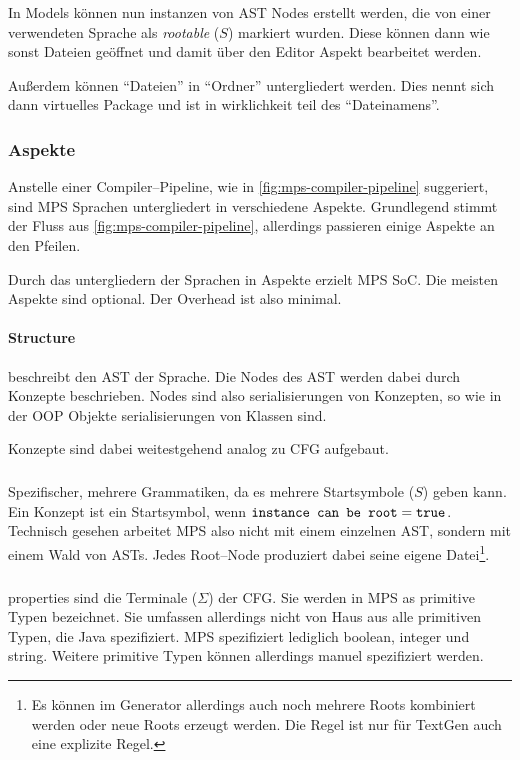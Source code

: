 In Models können nun instanzen von \ac{AST} Nodes erstellt werden, die von einer verwendeten Sprache als \textit {rootable} ($S$) markiert wurden.
Diese können dann wie sonst Dateien geöffnet und damit über den Editor Aspekt bearbeitet werden.

Außerdem können \enquote{Dateien} in \enquote{Ordner} untergliedert werden.
Dies nennt sich dann virtuelles Package und ist in wirklichkeit teil des \enquote{Dateinamens}.

\subsubsection{Aspekte}\label{subsubsec:aspekte}
Anstelle einer Compiler--Pipeline, wie in \autoref{fig:mps-compiler-pipeline} suggeriert, sind \ac{MPS} Sprachen untergliedert in verschiedene Aspekte.
Grundlegend stimmt der Fluss aus \autoref{fig:mps-compiler-pipeline}, allerdings passieren einige Aspekte an den Pfeilen.

Durch das untergliedern der Sprachen in Aspekte erzielt \ac{MPS} \ac{SoC}.
Die meisten Aspekte sind optional.
Der Overhead ist also minimal.

\paragraph{Structure} beschreibt den \ac{AST} der Sprache.
Die Nodes des \ac{AST} werden dabei durch Konzepte beschrieben.
Nodes sind also serialisierungen von Konzepten, so wie in der \ac{OOP} Objekte serialisierungen von Klassen sind.


Konzepte sind dabei weitestgehend analog zu \ac{CFG} aufgebaut.

\subparagraph*{}
Spezifischer, mehrere Grammatiken, da es mehrere Startsymbole ($S$) geben kann.
Ein Konzept ist ein Startsymbol, wenn $\text{\ttfamily instance can be root}=\text{\ttfamily true}$.
Technisch gesehen arbeitet \ac{MPS} also nicht mit einem einzelnen \ac{AST}, sondern mit einem Wald von \acp{AST}.
Jedes Root--Node produziert dabei seine eigene Datei\footnote{Es können im Generator allerdings auch noch mehrere Roots kombiniert werden oder neue Roots erzeugt werden. Die Regel ist nur für TextGen auch eine explizite Regel.}.

\subparagraph*{}
{\ttfamily properties} sind die Terminale ($\Sigma$) der \ac{CFG}.
Sie werden in \ac{MPS} as primitive Typen bezeichnet.
Sie umfassen allerdings nicht von Haus aus alle primitiven Typen, die Java spezifiziert.
\ac{MPS} spezifiziert lediglich {\ttfamily boolean}, {\ttfamily integer} und {\ttfamily string}.
Weitere primitive Typen können allerdings manuel spezifiziert werden.

